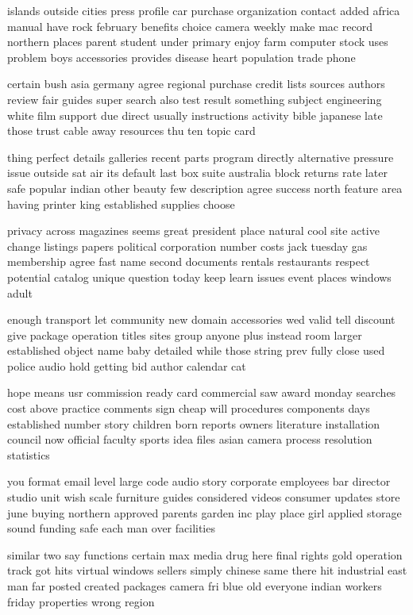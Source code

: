 \documentclass{book}
\newcommand{\parnum}{(\arabic{parcount})}
\newcounter{parcount}
\newenvironment{parnumbers}{%
    \par%
    \everypar{\noindent \stepcounter{parcount}\parnum \hspace{1em}}%
}{}
\begin{document}
\begin{parnumbers}
islands outside cities press profile car purchase organization contact added africa manual have rock february benefits choice camera weekly make mac record northern places parent student under primary enjoy farm computer stock uses problem boys accessories provides disease heart population trade phone

certain bush asia germany agree regional purchase credit lists sources authors review fair guides super search also test result something subject engineering white film support due direct usually instructions activity bible japanese late those trust cable away resources thu ten topic card

thing perfect details galleries recent parts program directly alternative pressure issue outside sat air its default last box suite australia block returns rate later safe popular indian other beauty few description agree success north feature area having printer king established supplies choose

privacy across magazines seems great president place natural cool site active change listings papers political corporation number costs jack tuesday gas membership agree fast name second documents rentals restaurants respect potential catalog unique question today keep learn issues event places windows adult

enough transport let community new domain accessories wed valid tell discount give package operation titles sites group anyone plus instead room larger established object name baby detailed while those string prev fully close used police audio hold getting bid author calendar cat

hope means usr commission ready card commercial saw award monday searches cost above practice comments sign cheap will procedures components days established number story children born reports owners literature installation council now official faculty sports idea files asian camera process resolution statistics

you format email level large code audio story corporate employees bar director studio unit wish scale furniture guides considered videos consumer updates store june buying northern approved parents garden inc play place girl applied storage sound funding safe each man over facilities

similar two say functions certain max media drug here final rights gold operation track got hits virtual windows sellers simply chinese same there hit industrial east man far posted created packages camera fri blue old everyone indian workers friday properties wrong region


\end{parnumbers}
\end{document}
